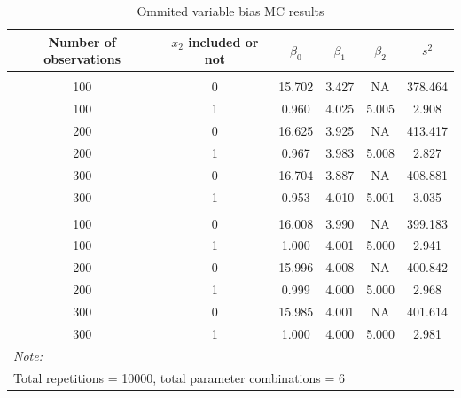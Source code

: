 \documentclass[10pt,a4paper]{article}
\begin{document}
 \begin{table}[H]

 \caption{\label{tab:ommiols}Ommited variable bias MC results}
 \centering
 \begin{tabular}[t]{cccccc}
 \toprule
 Number of observations & $x_2$ included or not & $\beta_0$ & $\beta_1$ & $\beta_2$ & $s^2$\\
 \midrule
 \addlinespace[0.3em]
 \multicolumn{6}{l}{\textbf{N = 10}}\\
 \hspace{1em}100 & 0 & 15.702 & 3.427 & NA & 378.464\\
 \hspace{1em}100 & 1 & 0.960 & 4.025 & 5.005 & 2.908\\
 \hspace{1em}200 & 0 & 16.625 & 3.925 & NA & 413.417\\
 \hspace{1em}200 & 1 & 0.967 & 3.983 & 5.008 & 2.827\\
 \hspace{1em}300 & 0 & 16.704 & 3.887 & NA & 408.881\\
 \hspace{1em}300 & 1 & 0.953 & 4.010 & 5.001 & 3.035\\
 \addlinespace[0.3em]
 \multicolumn{6}{l}{\textbf{N = 10000}}\\
 \hspace{1em}100 & 0 & 16.008 & 3.990 & NA & 399.183\\
 \hspace{1em}100 & 1 & 1.000 & 4.001 & 5.000 & 2.941\\
 \hspace{1em}200 & 0 & 15.996 & 4.008 & NA & 400.842\\
 \hspace{1em}200 & 1 & 0.999 & 4.000 & 5.000 & 2.968\\
 \hspace{1em}300 & 0 & 15.985 & 4.001 & NA & 401.614\\
 \hspace{1em}300 & 1 & 1.000 & 4.000 & 5.000 & 2.981\\
 \bottomrule
 \multicolumn{6}{l}{\rule{0pt}{1em}\textit{Note: }}\\
 \multicolumn{6}{l}{\rule{0pt}{1em}Total repetitions = 10000, total parameter combinations = 6}\\
 \end{tabular}
 \end{table}
\end{document}
